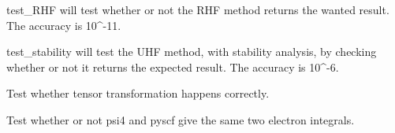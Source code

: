 \documentclass[letterpaper,10pt,english]{sphinxmanual}
\begin{document}
\begin{fulllineitems}
\label{\detokenize{tests:hf.tests.test_auth.test_rhf}}
test\_RHF will test whether or not the RHF method returns the wanted result. The accuracy is 10\textasciicircum{}-11.

\end{fulllineitems}


\begin{fulllineitems}
\label{\detokenize{tests:hf.tests.test_auth.test_stability}}
test\_stability will test the UHF method, with stability analysis, by checking whether or not it returns
the expected result. The accuracy is 10\textasciicircum{}-6.

\end{fulllineitems}


\begin{fulllineitems}
\label{\detokenize{tests:hf.tests.test_auth.test_tensor_transform}}
Test whether tensor transformation happens correctly.

\end{fulllineitems}


\begin{fulllineitems}
\label{\detokenize{tests:hf.tests.test_auth.test_two_e}}
Test whether or not psi4 and pyscf give the same two electron integrals.

\end{fulllineitems}

\end{document}
